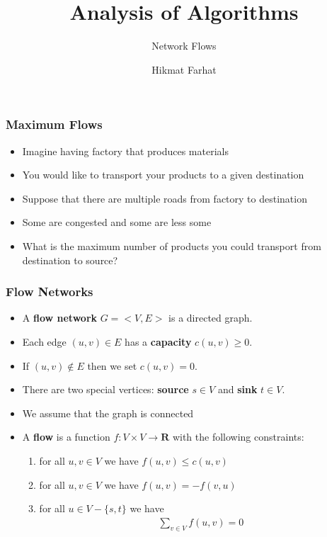 \documentclass{beamer}
\title{ Analysis of Algorithms}
\subtitle{Network Flows}
\author{Hikmat Farhat}
\newcommand{\set}[1]{\ensuremath{\{#1\}}}
\begin{document}
\frame{\titlepage}

\begin{frame}
  \frametitle{Maximum Flows}
\begin{itemize}
  \item Imagine having factory that produces materials
  \item You would like to transport your products to a given destination
  \item Suppose that there are multiple roads from factory to destination
  \item Some are congested and some are less some
  \item What is the maximum number of products you could transport from destination to source?
\end{itemize}
  

\end{frame}  
\begin{frame}
  \frametitle{Flow Networks}
\begin{itemize}
  \item A \textbf{flow network} $G=<V,E>$ is a directed graph.
  \item Each edge $(u,v)\in E$ has a \textbf{capacity} $c(u,v)\ge 0$.
  \item If $(u,v)\notin E$ then we set $c(u,v)=0$.
  \item There are two special vertices: \textbf{source} $s\in V$ and \textbf{sink} $t\in V$.
  \item We assume that the graph is connected
  \item A \textbf{flow} is a function $f:V\times V\rightarrow \mathbf{R}$ with the following constraints:
  \begin{enumerate}
    \item for all $u,v\in V$ we have $f(u,v)\le c(u,v)$
    \item for all $u,v\in V$ we have $f(u,v)=-f(v,u)$
    \item for all $u\in V-\set{s,t}$ we have
    \begin{align*}
      \sum_{v\in V}f(u,v)=0
    \end{align*}
  \end{enumerate}
\end{itemize}
  

\end{frame}
\end{document}
